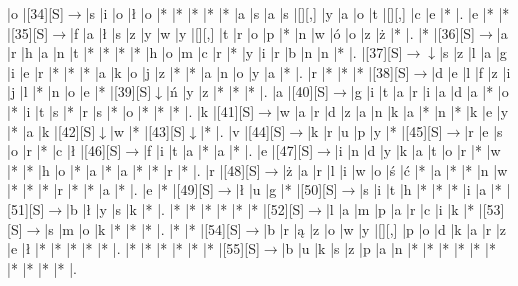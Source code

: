 \documentclass[11pt]{article}
\newcommand\drarr{$\rightarrow \!\!\!\!\! \downarrow$}
\newcommand\rarr{$\rightarrow$}
\newcommand\darr{$\downarrow$}
\begin{document}
\begin{Puzzle}{24}{30}
|o	|[34][S]\rarr	|s	|i	|o	|ł	|o	|*	|*	|*	|*	|*	|a	|s	|a	|s	|[][,]{ }	|y	|a	|o	|t	|[][,]{ }	|c	|e	|*	|.
|e	|*	|*	|[35][S]\rarr	|f	|a	|ł	|s	|z	|y	|w	|y	|[][,]{ }	|t	|r	|o	|p	|*	|n	|w	|ó	|o	|z	|ż	|*	|.
|*	|[36][S]\rarr	|a	|r	|h	|a	|n	|t	|*	|*	|*	|*	|h	|o	|m	|c	|r	|*	|y	|i	|r	|b	|n	|n	|*	|.
|[37][S]\drarr	|s	|z	|l	|a	|g	|i	|e	|r	|*	|*	|*	|a	|k	|o	|j	|z	|*	|*	|a	|n	|o	|y	|a	|*	|.
|r	|*	|*	|*	|[38][S]\rarr	|d	|e	|l	|f	|z	|i	|j	|l	|*	|n	|o	|e	|*	|[39][S]\darr	|ń	|y	|z	|*	|*	|*	|.
|a	|[40][S]\rarr	|g	|i	|t	|a	|r	|i	|a	|d	|a	|*	|o	|*	|i	|t	|s	|*	|r	|s	|*	|o	|*	|*	|*	|.
|k	|[41][S]\rarr	|w	|a	|r	|d	|z	|a	|n	|k	|a	|*	|n	|*	|k	|e	|y	|*	|a	|k	|[42][S]\darr	|w	|*	|[43][S]\darr	|*	|.
|v	|[44][S]\rarr	|k	|r	|u	|p	|y	|*	|[45][S]\rarr	|r	|e	|s	|o	|r	|*	|c	|ł	|[46][S]\rarr	|f	|i	|t	|a	|*	|a	|*	|.
|e	|[47][S]\rarr	|i	|n	|d	|y	|k	|a	|t	|o	|r	|*	|w	|*	|*	|h	|o	|*	|a	|*	|a	|*	|*	|r	|*	|.
|r	|[48][S]\rarr	|ż	|a	|r	|l	|i	|w	|o	|ś	|ć	|*	|a	|*	|*	|n	|w	|*	|*	|*	|r	|*	|*	|a	|*	|.
|e	|*	|[49][S]\rarr	|ł	|u	|g	|*	|[50][S]\rarr	|s	|i	|t	|h	|*	|*	|*	|i	|a	|*	|[51][S]\rarr	|b	|ł	|y	|s	|k	|*	|.
|*	|*	|*	|*	|*	|*	|[52][S]\rarr	|l	|a	|m	|p	|a	|r	|c	|i	|k	|*	|[53][S]\rarr	|s	|m	|o	|k	|*	|*	|*	|.
|*	|*	|[54][S]\rarr	|b	|r	|ą	|z	|o	|w	|y	|[][,]{ }	|p	|o	|d	|k	|a	|r	|z	|e	|ł	|*	|*	|*	|*	|*	|.
|*	|*	|*	|*	|*	|*	|[55][S]\rarr	|b	|u	|k	|s	|z	|p	|a	|n	|*	|*	|*	|*	|*	|*	|*	|*	|*	|*	|.\end{Puzzle}

\newpage
\end{document}
